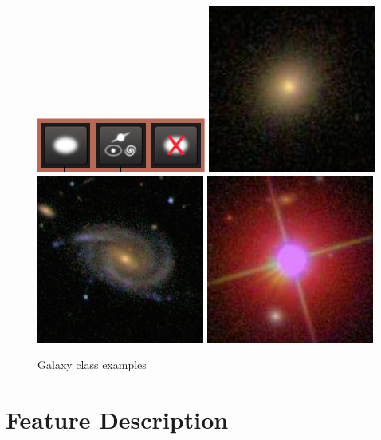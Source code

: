 \documentclass[10pt]{article}
\begin{document}
\begin{figure}[h]
\begin{center}
\includegraphics[scale=1.35]{images/class_examples.png}
\linebreak
\includegraphics[scale=0.6]{images/Class1_1.jpg}
\includegraphics[scale=0.6]{images/Class1_2.jpg}
\includegraphics[scale=0.6]{images/Class1_3.jpg}
\caption{Galaxy class examples}
\end{center}
\label{fig:data}
\end{figure}


\section*{Feature Description}
\end{document}
